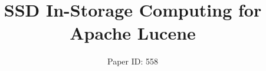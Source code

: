 


\title{SSD In-Storage Computing for Apache Lucene}



\author{Paper ID: 558}
\maketitle



















